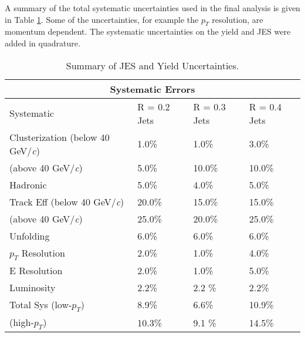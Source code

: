 A summary of the total systematic uncertainties used in the final analysis is given in Table \ref{table:1}.  Some of the uncertainties, for example the $p_{T}$ resolution, are momentum dependent.  The systematic uncertainties on the yield and JES were added in quadrature.
\newline

\begin{table}[h!]
\centering
\caption{Summary of JES and Yield Uncertainties.}
\begin{tabular}{ |p{5cm}||p{3cm}|p{3cm}|p{3cm}|  }
 \hline
 \multicolumn{4}{|c|}{Systematic Errors} \\
 \hline
 Systematic &R = 0.2 Jets & R = 0.3 Jets& R = 0.4 Jets\\
 \hline
Clusterization (below 40 GeV/\textit{c}) & 1.0\%    &1.0\%&  3.0\%\\
 (above 40 GeV/\textit{c})           &  5.0\%  & 10.0\%   &  10.0\%\\
Hadronic &   5.0\% & 4.0\% & 5.0\%\\
Track Eff (below 40 GeV/\textit{c})&20.0\% & 15.0\% & 15.0\%\\
 (above 40 GeV/\textit{c})            &  25.0\%  & 20.0\%   &  25.0\%\\
Unfolding & 6.0\% & 6.0\%&  6.0\%\\
$p_{T}$ Resolution & 2.0\% & 1.0\% & 4.0\%\\
E Resolution& 2.0\%   &1.0\% & 5.0\%\\
Luminosity & 2.2\%  & 2.2 \% & 2.2\%\\
 \hline
 \hline
Total Sys (low-$p_{T}$) & 8.9\%  & 6.6\% & 10.9\%\\
(high-$p_{T}$) & 10.3\%  & 9.1 \% & 14.5\%\\
\hline
\end{tabular}

\label{table:1}
\end{table}


